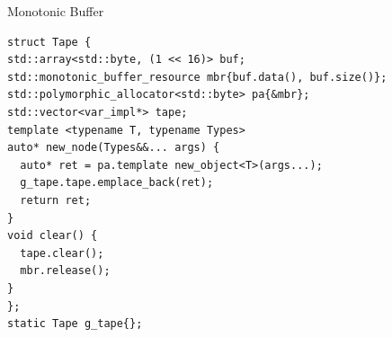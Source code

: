 \documentclass[dvipsnames]{beamer}
\begin{document}

\begin{frame}[fragile]{Monotonic Buffer}
\begin{verbatim}
struct Tape {
std::array<std::byte, (1 << 16)> buf;
std::monotonic_buffer_resource mbr{buf.data(), buf.size()};
std::polymorphic_allocator<std::byte> pa{&mbr};
std::vector<var_impl*> tape;
template <typename T, typename Types>
auto* new_node(Types&&... args) {
  auto* ret = pa.template new_object<T>(args...);
  g_tape.tape.emplace_back(ret);
  return ret;
}
void clear() {
  tape.clear();
  mbr.release();
}
};
static Tape g_tape{};
\end{verbatim}
\end{frame}
\end{document}
